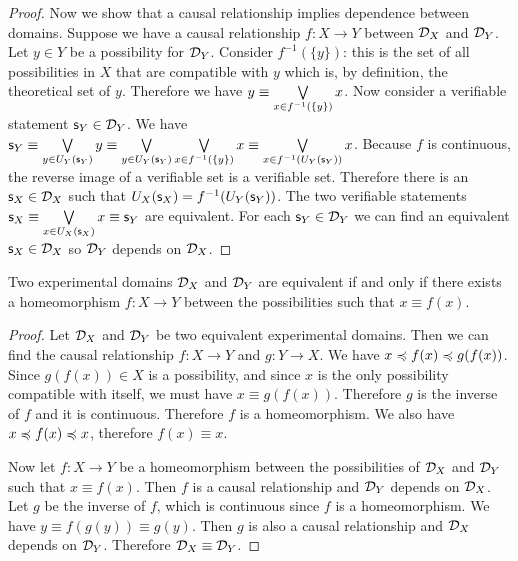 \documentclass[11pt,letterpaper,fleqn]{memoir} %
\begin{document}
\begin{mathSection}
\begin{proof}
		Now we show that a causal relationship implies dependence between domains. Suppose we have a causal relationship $f: X \to Y$ between $\mathcal{D}_X$ and $\mathcal{D}_Y$. Let $y \in Y$ be a possibility for $\mathcal{D}_Y$. Consider  $f^{-1}(\{y\})$: this is the set of all possibilities in $X$ that are compatible with $y$ which is, by definition, the theoretical set of $y$. Therefore we have $y \equiv \bigvee\limits_{x \in f^{-1}(\{y\})} x$. Now consider a verifiable statement $\mathsf{s}_Y \in \mathcal{D}_Y$. We have $\mathsf{s}_Y \equiv \bigvee\limits_{y \in U_Y(\mathsf{s}_Y)} y \equiv \bigvee\limits_{y \in U_Y(\mathsf{s}_Y)} \bigvee\limits_{x \in f^{-1}(\{y\})} x \equiv \bigvee\limits_{x \in f^{-1}(U_Y(\mathsf{s}_Y))} x$. Because $f$ is continuous, the reverse image of a verifiable set is a verifiable set. Therefore there is an $\mathsf{s}_X \in \mathcal{D}_X$ such that $U_X(\mathsf{s}_X) = f^{-1}(U_Y(\mathsf{s}_Y))$. The two verifiable statements $\mathsf{s}_X \equiv \bigvee\limits_{x \in U_X(\mathsf{s}_X)} x \equiv \mathsf{s}_Y$ are equivalent. For each $\mathsf{s}_Y \in \mathcal{D}_Y$ we can find an equivalent $\mathsf{s}_X \in \mathcal{D}_X$ so $\mathcal{D}_Y$ depends on $\mathcal{D}_X$.
	\end{proof}

\begin{coro}
	Two experimental domains $\mathcal{D}_{X}$ and $\mathcal{D}_{Y}$ are equivalent if and only if there exists a homeomorphism $f : X \to Y$ between the possibilities such that $x \equiv f(x)$.
\end{coro}
\begin{proof}
	Let $\mathcal{D}_{X}$ and $\mathcal{D}_{Y}$ be two equivalent experimental domains. Then we can find the causal relationship $f : X \to Y$ and $g : Y \to X$. We have $x \preccurlyeq f(x) \preccurlyeq g(f(x))$. Since $g(f(x)) \in X$ is a possibility, and since $x$ is the only possibility compatible with itself, we must have $x \equiv g(f(x))$. Therefore $g$ is the inverse of $f$ and it is continuous. Therefore $f$ is a homeomorphism. We also have $x \preccurlyeq f(x) \preccurlyeq x$, therefore $f(x) \equiv x$.
	
	Now let $f : X \to Y$ be a homeomorphism between the possibilities of $\mathcal{D}_{X}$ and $\mathcal{D}_{Y}$ such that $x \equiv f(x)$. Then $f$ is a causal relationship and $\mathcal{D}_{Y}$ depends on $\mathcal{D}_{X}$. Let $g$ be the inverse of $f$, which is continuous since $f$ is a homeomorphism. We have $y \equiv f(g(y)) \equiv g(y)$. Then $g$ is also a causal relationship and $\mathcal{D}_{X}$ depends on $\mathcal{D}_{Y}$. Therefore $\mathcal{D}_{X} \equiv \mathcal{D}_{Y}$.
\end{proof}
\end{mathSection}
\end{document}
